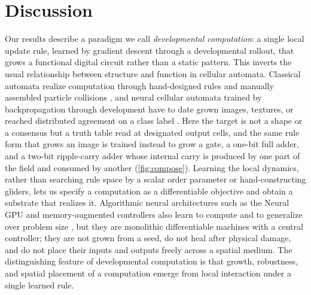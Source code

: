 \section{Discussion}

Our results describe a paradigm we call \emph{developmental computation}: a single local update rule, learned by gradient descent through a developmental rollout, that grows a functional digital circuit rather than a static pattern. This inverts the usual relationship between structure and function in cellular automata. Classical automata realize computation through hand-designed rules and manually assembled particle collisions \citep{vonneumann1966automata,cook2004rule110}, and neural cellular automata trained by backpropagation through development have to date grown images, textures, or reached distributed agreement on a class label \citep{mordvintsev2020growing,niklasson2021textures,randazzo2020selfclassifying,miotti2025difflogicca}. Here the target is not a shape or a consensus but a truth table read at designated output cells, and the same rule form that grows an image is trained instead to grow a gate, a one-bit full adder, and a two-bit ripple-carry adder whose internal carry is produced by one part of the field and consumed by another (\ref{fig:compose}). Learning the local dynamics, rather than searching rule space by a scalar order parameter \citep{langton1990edgeofchaos} or hand-constructing gliders, lets us specify a computation as a differentiable objective and obtain a substrate that realizes it. Algorithmic neural architectures such as the Neural GPU and memory-augmented controllers also learn to compute and to generalize over problem size \citep{kaiser2016neuralgpu,graves2014ntm,graves2016dnc}, but they are monolithic differentiable machines with a central controller; they are not grown from a seed, do not heal after physical damage, and do not place their inputs and outputs freely across a spatial medium. The distinguishing feature of developmental computation is that growth, robustness, and spatial placement of a computation emerge from local interaction under a single learned rule.


